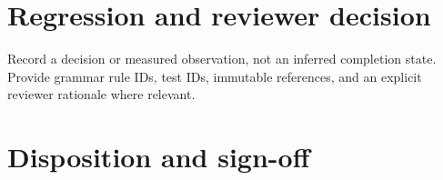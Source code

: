 \documentclass[11pt,letterpaper]{article}
\begin{document}
\section{Regression and reviewer decision}
Record a decision or measured observation, not an inferred completion state. Provide grammar rule IDs, test IDs, immutable references, and an explicit reviewer rationale where relevant.
\section{Disposition and sign-off}
\end{document}
